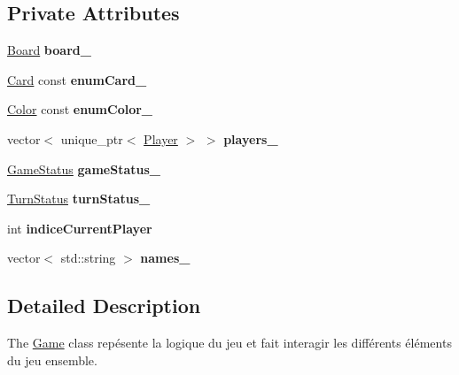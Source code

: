 \subsection*{Private Attributes}
\begin{DoxyCompactItemize}
\item 
\mbox{\label{class_game_a534b4dd49eb8c2533ff20e6641a1d107}} 
\mbox{\hyperlink{class_board}{Board}} {\bfseries board\+\_\+}
\item 
\mbox{\label{class_game_abe937e1a5d1a22d6cdaa8cabb9152c67}} 
\mbox{\hyperlink{class_card}{Card}} const {\bfseries enum\+Card\+\_\+}
\item 
\mbox{\label{class_game_a9717ae5b145e457f045b38e4fac623f7}} 
\mbox{\hyperlink{class_color}{Color}} const {\bfseries enum\+Color\+\_\+}
\item 
\mbox{\label{class_game_af5269c50ea7d59e15c7abed439f13a83}} 
vector$<$ unique\+\_\+ptr$<$ \mbox{\hyperlink{class_player}{Player}} $>$ $>$ {\bfseries players\+\_\+}
\item 
\mbox{\label{class_game_a5111b35a6c981465438f76308a6abc76}} 
\mbox{\hyperlink{class_game_ad7fdf24774752f47b6a14827e8bbc073}{Game\+Status}} {\bfseries game\+Status\+\_\+}
\item 
\mbox{\label{class_game_a8bf9696c3e7e782203b634f79dde5994}} 
\mbox{\hyperlink{class_game_ad84f6c74c0b4b323fe4b13b7ad31f696}{Turn\+Status}} {\bfseries turn\+Status\+\_\+}
\item 
\mbox{\label{class_game_a5697736899760ca3bf12a013cf2843c9}} 
int {\bfseries indice\+Current\+Player}
\item 
\mbox{\label{class_game_a94ac538c726b0c162fbc7c24dd7e0ce9}} 
vector$<$ std\+::string $>$ {\bfseries names\+\_\+}
\end{DoxyCompactItemize}


\subsection{Detailed Description}
The \mbox{\hyperlink{class_game}{Game}} class repésente la logique du jeu et fait interagir les différents éléments du jeu ensemble. 

